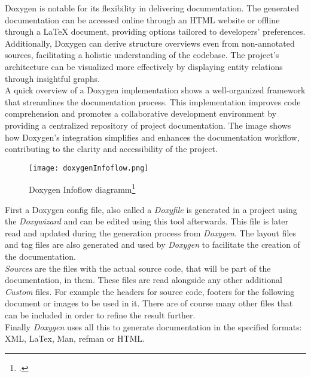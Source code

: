 Doxygen is notable for its flexibility in delivering documentation. The generated documentation can be accessed online through an HTML website or offline 
through a LaTeX document, providing options tailored to developers' preferences. Additionally, Doxygen can derive structure overviews even from non-annotated 
sources, facilitating a holistic understanding of the codebase. The project's architecture can be visualized more effectively by displaying entity relations 
through insightful graphs.\\

A quick overview of a Doxygen implementation shows a well-organized framework that streamlines the documentation process. This implementation improves code 
comprehension and promotes a collaborative development environment by providing a centralized repository of project documentation. The image shows how Doxygen's 
integration simplifies and enhances the documentation workflow, contributing to the clarity and accessibility of the project.\\

\begin{figure}[h]
	\centering
	\texttt{[image: doxygenInfoflow.png]} 
	\caption{Doxygen Infoflow diagramm\footcite{doxygen_main_site}}
	\label{pic:doxygenInfoflow}
\end{figure}

First a Doxygen config file, also called a \textit{Doxyfile} is generated in a project using the \textit{Doxywizard} and can be edited using this tool afterwards. 
This file is later read and updated during the generation process from \textit{Doxygen}. The layout files and tag files are also generated and used by \textit{Doxygen}
to facilitate the creation of the documentation.\\
\vspace{\baselineskip}
\textit{Sources} are the files with the actual source code, that will be part of the documentation, in them. These files are read alongside any other additional \textit{Custom}
files. For example the headers for source code, footers for the following document or images to be used in it. There are of course many other files that can be included
in order to refine the result further.\\
\vspace{\baselineskip}
Finally \textit{Doxygen} uses all this to generate documentation in the specified formats: XML, LaTex, Man, refman or HTML. \\

